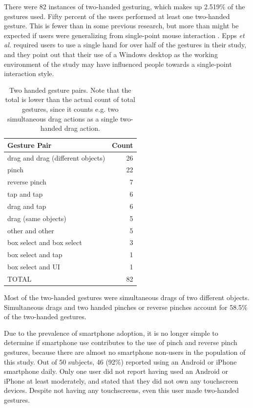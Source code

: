 There were 82 instances of two-handed gesturing, which makes up 2.519\% of the gestures used.
Fifty percent of the users performed at least one two-handed gesture. 
This is fewer than in some previous research, but more than might be expected if users were generalizing from single-point mouse interaction \citep{micire2010multi, epps2006study}.
Epps \emph{et al.} required users to use a single hand for over half of the gestures in their study, and they point out that their use of a Windows desktop as the working environment of the study may have influenced people towards a single-point interaction style. 



\begin{table}
	\centering
	\begin{tabular}{l r}
		Gesture Pair & Count\\
		\hline
		drag and drag (different objects) & 26 \\
		pinch & 22\\
		reverse pinch & 7\\
		tap and tap & 6\\
		drag and tap & 6\\
		drag (same objects) & 5\\
		other and other & 5\\		
		box select and box select & 3\\
		box select and tap & 1\\
		box select and UI & 1\\
		\hline
		TOTAL & 82\\
	\end{tabular}
	\caption{Two handed gesture pairs. Note that the total is lower than the actual count of total gestures, since it counts e.g. two simultaneous drag actions as a single two-handed drag action.}
\end{table}

Most of the two-handed gestures were simultaneous drags of two different objects. 
Simultaneous drags and two handed pinches or reverse pinches account for 58.5\% of the two-handed gestures.  

Due to the prevalence of smartphone adoption, it is no longer simple to determine if smartphone use contributes to the use of pinch and reverse pinch gestures, because there are almost no smartphone non-users in the population of this study. 
Out of 50 subjects, 46 (92\%) reported using an Android or iPhone smartphone daily. 
Only one user did not report having used an Android or iPhone at least moderately, and stated that they did not own any touchscreen devices. 
Despite not having any touchscreens, even this user made two-handed gestures. 

